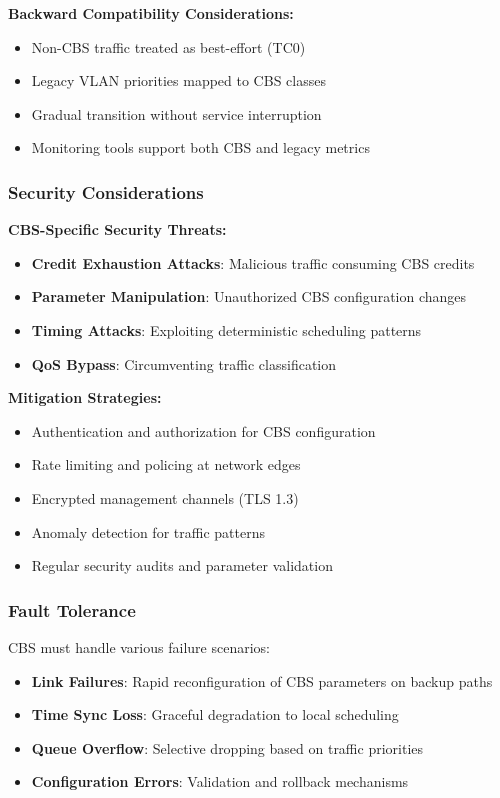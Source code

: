 \documentclass[10pt, journal, compsoc]{IEEEtran}
\begin{document}
\textbf{Backward Compatibility Considerations:}
\begin{itemize}
    \item Non-CBS traffic treated as best-effort (TC0)
    \item Legacy VLAN priorities mapped to CBS classes
    \item Gradual transition without service interruption
    \item Monitoring tools support both CBS and legacy metrics
\end{itemize}

\subsubsection{Security Considerations}

\textbf{CBS-Specific Security Threats:}
\begin{itemize}
    \item \textbf{Credit Exhaustion Attacks}: Malicious traffic consuming CBS credits
    \item \textbf{Parameter Manipulation}: Unauthorized CBS configuration changes
    \item \textbf{Timing Attacks}: Exploiting deterministic scheduling patterns
    \item \textbf{QoS Bypass}: Circumventing traffic classification
\end{itemize}

\textbf{Mitigation Strategies:}
\begin{itemize}
    \item Authentication and authorization for CBS configuration
    \item Rate limiting and policing at network edges
    \item Encrypted management channels (TLS 1.3)
    \item Anomaly detection for traffic patterns
    \item Regular security audits and parameter validation
\end{itemize}

\subsubsection{Fault Tolerance}

CBS must handle various failure scenarios:

\begin{itemize}
    \item \textbf{Link Failures}: Rapid reconfiguration of CBS parameters on backup paths
    \item \textbf{Time Sync Loss}: Graceful degradation to local scheduling
    \item \textbf{Queue Overflow}: Selective dropping based on traffic priorities
    \item \textbf{Configuration Errors}: Validation and rollback mechanisms
\end{itemize}
\end{document}
